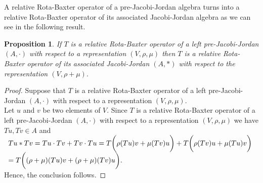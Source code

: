 \documentclass[12pt]{amsart}
\newtheorem{proposition}[Theorem]{Proposition}
\begin{document}
A relative Rota-Baxter operator of a pre-Jacobi-Jordan algebra turns into a relative Rota-Baxter operator of its associated Jacobi-Jordan algebra as we can see in the following result.
\begin{proposition}
	If $T$ is a relative Rota-Baxter operator of a left pre-Jacobi-Jordan $(A,\cdot)$ with respect to a representation $(V, \rho,\mu)$
	then $T$ is a relative Rota-Baxter operator of its associated Jacobi-Jordan $(A,\ast)$ with respect  to the representation $(V, \rho+\mu).$
\end{proposition}
\begin{proof}
	Suppose that $T$ is a relative Rota-Baxter operator of a left pre-Jacobi-Jordan $(A,\cdot)$ with respect to a representation $(V, \rho,\mu)$. \\
	Let $ u $ and $ v $ be two elements of $ V $. Since  $T$ is a relative Rota-Baxter  operator of a left pre-Jacobi-Jordan $(A,\cdot)$ with respect to a representation $(V, \rho,\mu)$ we have $ Tu, Tv\in A $ and  \\
	$ \begin{array}{lcr}
	Tu\ast Tv= Tu\cdot Tv+Tv\cdot Tu
	=T\biggl(\rho(Tu)v+\mu(Tv)u \biggr)+T\biggl(\rho(Tv)u+\mu(Tu)v \biggr) \\
	=T\biggl((\rho+\mu)(Tu)v+(\rho+\mu)(Tv)u \biggr).
	\end{array}\\
	 $
	 Hence, the conclusion follows.
\end{proof}
\end{document}
